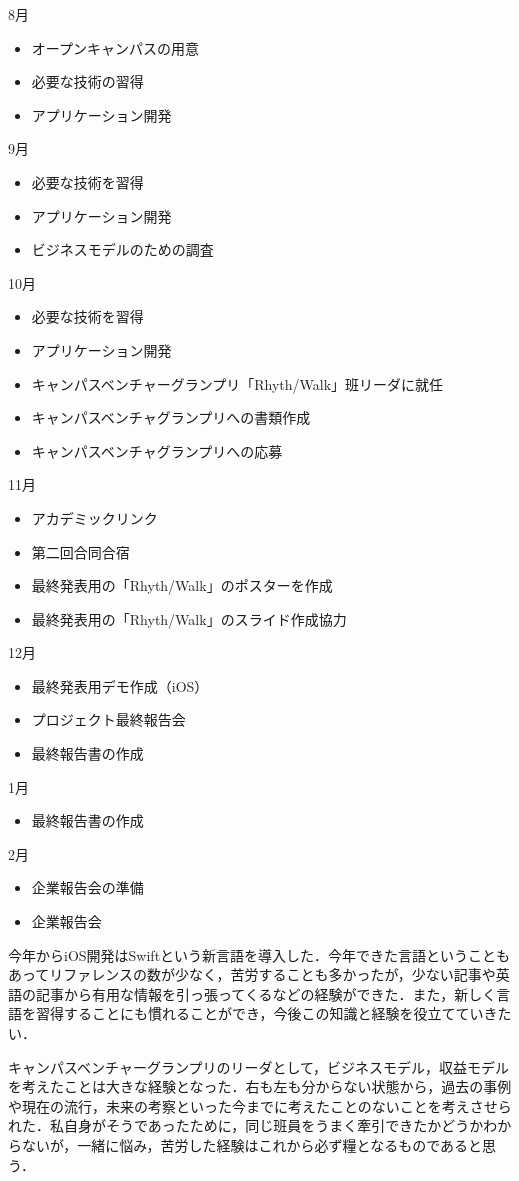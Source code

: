 8月
\begin{itemize}
\item オープンキャンパスの用意
\item 必要な技術の習得
\item アプリケーション開発
\end{itemize}
9月
\begin{itemize}
\item 必要な技術を習得
\item アプリケーション開発
\item ビジネスモデルのための調査
\end{itemize}
10月
\begin{itemize}
\item 必要な技術を習得
\item アプリケーション開発
\item キャンパスベンチャーグランプリ「Rhyth/Walk」班リーダに就任
\item キャンパスベンチャグランプリへの書類作成
\item キャンパスベンチャグランプリへの応募
\end{itemize}
11月
\begin{itemize}
\item アカデミックリンク
\item 第二回合同合宿
\item 最終発表用の「Rhyth/Walk」のポスターを作成
\item 最終発表用の「Rhyth/Walk」のスライド作成協力
\end{itemize}
12月
\begin{itemize}
\item 最終発表用デモ作成（iOS）
\item プロジェクト最終報告会
\item 最終報告書の作成
\end{itemize}
1月
\begin{itemize}
\item 最終報告書の作成
\end{itemize}
2月
\begin{itemize}
\item 企業報告会の準備
\item 企業報告会
\end{itemize}
\par
今年からiOS開発はSwiftという新言語を導入した．今年できた言語ということもあってリファレンスの数が少なく，苦労することも多かったが，少ない記事や英語の記事から有用な情報を引っ張ってくるなどの経験ができた．また，新しく言語を習得することにも慣れることができ，今後この知識と経験を役立てていきたい．
\par
キャンパスベンチャーグランプリのリーダとして，ビジネスモデル，収益モデルを考えたことは大きな経験となった．右も左も分からない状態から，過去の事例や現在の流行，未来の考察といった今までに考えたことのないことを考えさせられた．私自身がそうであったために，同じ班員をうまく牽引できたかどうかわからないが，一緒に悩み，苦労した経験はこれから必ず糧となるものであると思う．
